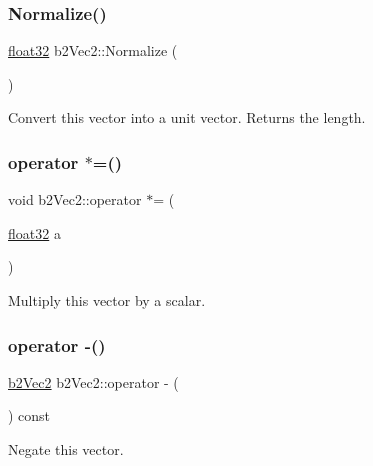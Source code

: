 \subsubsection{\texorpdfstring{Normalize()}{Normalize()}}
{\footnotesize\ttfamily \mbox{\hyperlink{b2_settings_8h_aacdc525d6f7bddb3ae95d5c311bd06a1}{float32}} b2\+Vec2\+::\+Normalize (\begin{DoxyParamCaption}{ }\end{DoxyParamCaption})\hspace{0.3cm}{\ttfamily [inline]}}



Convert this vector into a unit vector. Returns the length. 

\mbox{\label{structb2_vec2_a256c67f57abe2c40b1b83edc467b4b5a}} 
\subsubsection{\texorpdfstring{operator $\ast$=()}{operator *=()}}
{\footnotesize\ttfamily void b2\+Vec2\+::operator $\ast$= (\begin{DoxyParamCaption}\item[{\mbox{\hyperlink{b2_settings_8h_aacdc525d6f7bddb3ae95d5c311bd06a1}{float32}}}]{a }\end{DoxyParamCaption})\hspace{0.3cm}{\ttfamily [inline]}}



Multiply this vector by a scalar. 

\mbox{\label{structb2_vec2_a80d431f7a92b72ec7c409ec5d403a720}} 
\subsubsection{\texorpdfstring{operator -\/()}{operator -()}}
{\footnotesize\ttfamily \mbox{\hyperlink{structb2_vec2}{b2\+Vec2}} b2\+Vec2\+::operator -\/ (\begin{DoxyParamCaption}{ }\end{DoxyParamCaption}) const\hspace{0.3cm}{\ttfamily [inline]}}



Negate this vector. 

